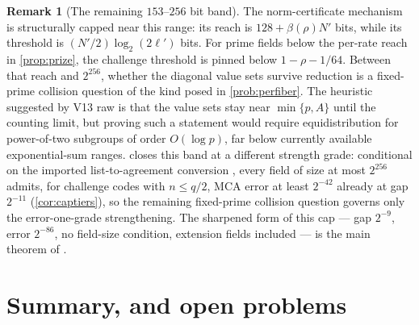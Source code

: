 \documentclass[11pt]{article}
\theoremstyle{definition}
\newtheorem{remark}[remark]{Remark}
\newcommand{\Acl}{A}
\begin{document}
\begin{remark}[The remaining $153$--$256$ bit band]\label{rem:capstone}
The norm-certificate mechanism is structurally capped near this range: its reach is $128+\beta(\rho)N'$ bits, while its threshold is $(N'/2)\log_2(2\ell')$ bits.  For prime fields below the per-rate reach in \cref{prop:prize}, the challenge threshold is pinned below $1-\rho-1/64$.  Between that reach and $2^{256}$, whether the diagonal value sets survive reduction is a fixed-prime collision question of the kind posed in \cref{prob:perfiber}.  The heuristic suggested by V13 raw is that the value sets stay near $\min\{p,\Acl\}$ until the counting limit, but proving such a statement would require equidistribution for power-of-two subgroups of order $O(\log p)$, far below currently available exponential-sum ranges.   closes this band at a different strength grade: conditional on the imported list-to-agreement conversion \cite{CS25,ABF26}, every field of size at most $2^{256}$ admits, for challenge codes with $n\le q/2$, MCA error at least $2^{-42}$ already at gap $2^{-11}$ (\cref{cor:captiers}), so the remaining fixed-prime collision question governs only the error-one-grade strengthening.  The sharpened form of this cap --- gap $2^{-9}$, error $2^{-86}$, no field-size condition, extension fields included --- is the main theorem of \cite{UniversalCap}.
\end{remark}


\section{Summary, and open problems}\label{sec:frontier}
\end{document}
